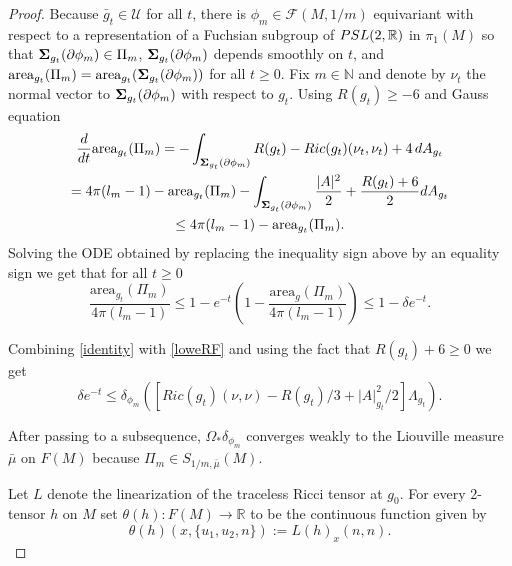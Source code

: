\documentclass[11pt]{amsart}
\def\R{\mathbb R}
\def\N{\mathbb N}
\theoremstyle{remark}
\theoremstyle{definition}
\begin{document}
{{\begin{proof}
		
		
		Because $\bar g_t\in \mathcal U$ for all $t$, there is $\phi_m\in \mathcal F(M,1/m)$ equivariant  with respect to a representation of a Fuchsian subgroup of  ${\rm PSL}(2,\R)$ in $\pi_1(M)$ so that ${\bf \Sigma}_{g_t}(\partial \phi_m)\in \Pi_m$, ${\bf \Sigma}_{g_t}(\partial \phi_m)$ depends smoothly on $t$, and $\text{area}_{g_t}(\Pi_m)=\text{area}_{g_t}({\bf \Sigma}_{g_t}(\partial \phi_m))$  for all $t\geq 0$. Fix $m\in\N$ and denote by $\nu_t$ the normal vector to ${\bf \Sigma}_{g_t}(\partial \phi_m)$ with respect to $g_t$. Using $R(g_t)\geq - 6$ and Gauss equation
		\begin{multline}\label{area.evolution}
			\frac{d}{dt}\text{area}_{g_t}(\Pi_m) = -\int_{{\bf \Sigma}_{g_t}(\partial \phi_m)}R(g_t)-Ric(g_t)(\nu_t,\nu_t)+4\,dA_{g_t}\\
			=4\pi(l_m-1)-\text{area}_{g_t}(\Pi_m)-\int_{{\bf \Sigma}_{g_t}(\partial \phi_m)} \frac{|A|^2}{2}+\frac{R(g_t)+6}{2}dA_{g_t} \\
			\leq 4\pi(l_m-1)-\text{area}_{g_t}(\Pi_m).
		\end{multline}
		Solving the ODE obtained by replacing the inequality sign above by an equality sign we get that for all $t\geq 0$
		\begin{equation}\label{loweRF}
			\frac{\text{area}_{g_t}(\Pi_m)}{4\pi(l_m-1)}\leq 1-e^{-t}\left(1-\frac{\text{area}_g(\Pi_m)}{4\pi(l_m-1)}\right)\leq 1-\delta e^{-t}.
		\end{equation}
		
		
		
		
		Combining \eqref{identity} with \eqref{loweRF} and using the fact that $R(g_t)+6\geq 0$ we get
		\begin{equation}\label{fund.identity}
			\delta e^{-t}\leq \delta_{\phi_m}\left(\left[Ric(g_t)(\nu,\nu)-{R(g_t)/3}+{|A|^2_{g_t}}/{2}\right]\Lambda_{g_t}\right).
		\end{equation}
		
		
		After passing to a subsequence, ${\Omega_*}\delta_{\phi_m}$ converges weakly to {the Liouville  measure $\bar \mu$ on $F(M)$ because $\Pi_m\in S_{1/m,\bar \mu}(M).$}
		
		
		Let $L$ denote the linearization of  the traceless Ricci tensor at $g_0$. For every $2$-tensor $h$ on $M$ set $\theta(h):F(M)\rightarrow \R$ to be the continuous  function given by
		\begin{equation}\label{theta.map}
			\theta(h)(x,\{u_1,u_2,n\}):=L(h)_{x}(n,n).
		\end{equation}
		

\end{proof}}}
\end{document}
